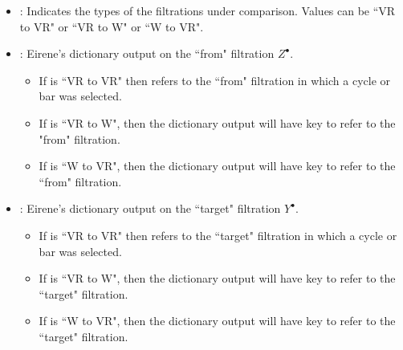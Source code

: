\documentclass{article}
\begin{document}
\begin{itemize}
\item {} : Indicates the types of the filtrations under comparison. Values can be ``VR to VR" or ``VR to W" or ``W to VR".
\item {}: Eirene's dictionary output on the ``from" filtration $Z^{\bullet}$.
	\begin{itemize}
	\item If  is ``VR to VR" then  refers to the ``from" filtration in which a cycle or bar was selected.
	\item If  is ``VR to W", then the dictionary output will have key  to refer to the "from" filtration.
	\item If  is ``W to VR", then the dictionary output will have key  to refer to the ``from" filtration.
	\end{itemize}
\item {}: Eirene's dictionary output on the ``target" filtration $Y^{\bullet}$.
	\begin{itemize}
	\item If  is ``VR to VR" then  refers to the ``target" filtration in which a cycle or bar was selected.
	\item If  is ``VR to W", then the dictionary output will have key  to refer to the ``target" filtration.
	\item If  is ``W to VR", then the dictionary output will have key  to refer to the ``target" filtration.


\end{itemize}
\end{itemize}
\end{document}
